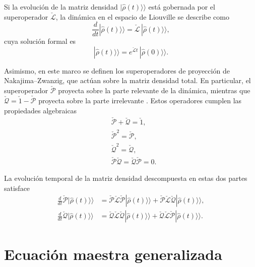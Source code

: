 Si la evolución de la matriz densidad $|\hat{\rho}(t)\rangle \rangle$ está gobernada por el superoperador $\check{\mathcal{L}}$, la dinámica en el espacio de Liouville se describe como
\begin{equation*}
    \frac{d}{dt}|\hat{\rho}(t) \rangle \rangle = \check{\mathcal{L}}\,|\hat{\rho}(t) \rangle \rangle,
\end{equation*}
cuya solución formal es
\begin{equation}
    |\hat{\rho}(t)\rangle \rangle = e^{\check{\mathcal{L}}t}\,|\hat{\rho}(0)\rangle \rangle. 
    \label{sec2liouvilleformal}
\end{equation}

Asimismo, en este marco se definen los superoperadores de proyección de Nakajima–Zwanzig, que actúan sobre la matriz densidad total. En particular, el superoperador $\check{\mathcal{P}}$ proyecta sobre la parte relevante de la dinámica, mientras que $\check{\mathcal{Q}} = \check{1} - \check{\mathcal{P}}$ proyecta sobre la parte irrelevante \cite{zwanzig1966statistical}. Estos operadores cumplen las propiedades algebraicas
\begin{align*}
    & \check{\mathcal{P}} + \check{\mathcal{Q}} = \check{1}, \\
    & \check{\mathcal{P}}^{2} = \check{\mathcal{P}}, \\
    & \check{\mathcal{Q}}^{2} = \check{\mathcal{Q}}, \\
    & \check{\mathcal{P}}\check{\mathcal{Q}} = \check{\mathcal{Q}}\check{\mathcal{P}} = 0.
\end{align*}

La evolución temporal de la matriz densidad descompuesta en estas dos partes satisface
\begin{align*}
    \frac{d}{dt}\check{\mathcal{P}}|\hat{\rho}(t)\rangle \rangle 
    &= \check{\mathcal{P}}\check{\mathcal{L}}\check{\mathcal{P}}|\hat{\rho}(t)\rangle \rangle  
     + \check{\mathcal{P}}\check{\mathcal{L}}\check{\mathcal{Q}}|\hat{\rho}(t)\rangle \rangle, \\
    \frac{d}{dt}\check{\mathcal{Q}}|\hat{\rho}(t)\rangle \rangle  
    &= \check{\mathcal{Q}}\check{\mathcal{L}}\check{\mathcal{Q}}|\hat{\rho}(t)\rangle \rangle  
     + \check{\mathcal{Q}}\check{\mathcal{L}}\check{\mathcal{P}}|\hat{\rho}(t)\rangle \rangle.
\end{align*}


\label{sec2:superop}


\section{Ecuación maestra generalizada}


